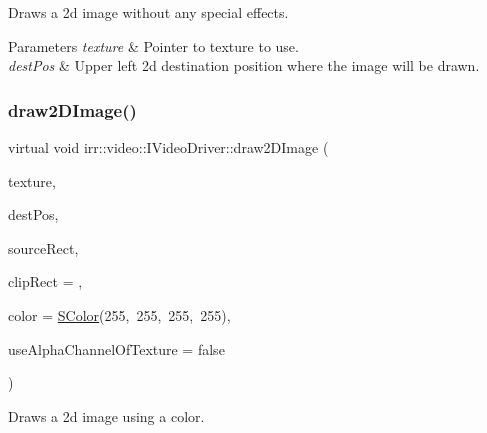 Draws a 2d image without any special effects. 


\begin{DoxyParams}{Parameters}
{\em texture} & Pointer to texture to use. \\
\hline
{\em dest\+Pos} & Upper left 2d destination position where the image will be drawn. \\
\hline
\end{DoxyParams}
\mbox{\label{classirr_1_1video_1_1IVideoDriver_a167d3a5e2ea5804bfa9ba9e526bbcdb3}} 
\subsubsection{\texorpdfstring{draw2\+D\+Image()}{draw2DImage()}\hspace{0.1cm}{\footnotesize\ttfamily [2/3]}}
{\footnotesize\ttfamily virtual void irr\+::video\+::\+I\+Video\+Driver\+::draw2\+D\+Image (\begin{DoxyParamCaption}\item[{const \hyperlink{classirr_1_1video_1_1ITexture}{video\+::\+I\+Texture} $\ast$}]{texture,  }\item[{const core\+::position2d$<$ \hyperlink{namespaceirr_ac66849b7a6ed16e30ebede579f9b47c6}{s32} $>$ \&}]{dest\+Pos,  }\item[{const \hyperlink{classirr_1_1core_1_1rect}{core\+::rect}$<$ \hyperlink{namespaceirr_ac66849b7a6ed16e30ebede579f9b47c6}{s32} $>$ \&}]{source\+Rect,  }\item[{const \hyperlink{classirr_1_1core_1_1rect}{core\+::rect}$<$ \hyperlink{namespaceirr_ac66849b7a6ed16e30ebede579f9b47c6}{s32} $>$ $\ast$}]{clip\+Rect = {},  }\item[{\hyperlink{classirr_1_1video_1_1SColor}{S\+Color}}]{color = {\ttfamily \hyperlink{classirr_1_1video_1_1SColor}{S\+Color}(255,~255,~255,~255)},  }\item[{bool}]{use\+Alpha\+Channel\+Of\+Texture = {\ttfamily false} }\end{DoxyParamCaption})\hspace{0.3cm}{\ttfamily [pure virtual]}}



Draws a 2d image using a color. 

